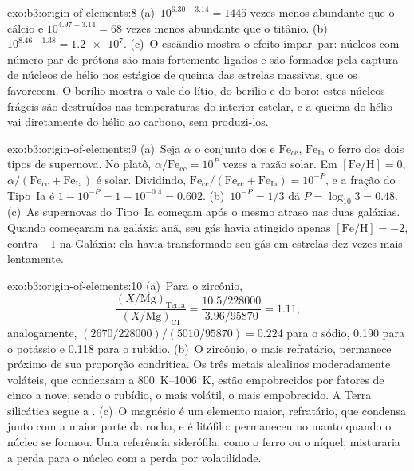 \begin{solution}{exo:b3:origin-of-elements:8}
(a)~$10^{6.30 - 3.14} = 1445$ vezes menos abundante que o cálcio e
$10^{4.97 - 3.14} = 68$ vezes menos abundante que o titânio. (b)~$10^{8.46 - 1.38}
= \num{1.2e7}$. (c)~O escândio mostra o efeito ímpar--par: núcleos com
número par de prótons são mais fortemente ligados e são formados pela
captura de núcleos de hélio nos estágios de queima das estrelas massivas, que os
favorecem. O berílio mostra o vale do lítio, do berílio e do boro:
estes núcleos frágeis são destruídos nas temperaturas do interior estelar,
e a queima do hélio vai diretamente do hélio ao carbono,
sem produzi-los.
\end{solution}

\begin{solution}{exo:b3:origin-of-elements:9}
(a)~Seja $\alpha$ o conjunto dos  e $\mathrm{Fe}_\mathrm{cc}$,
$\mathrm{Fe}_\mathrm{Ia}$ o ferro dos dois tipos de supernova. No
platô, $\alpha/\mathrm{Fe}_\mathrm{cc} = 10^{P}$ vezes a
razão solar. Em $[\mathrm{Fe/H}] = 0$, $\alpha/(\mathrm{Fe}_\mathrm{cc} +
\mathrm{Fe}_\mathrm{Ia})$ é solar. Dividindo,
$\mathrm{Fe}_\mathrm{cc}/(\mathrm{Fe}_\mathrm{cc} + \mathrm{Fe}_\mathrm{Ia})
= 10^{-P}$, e a fração do Tipo~Ia é $1 - 10^{-P} = 1 - 10^{-0.4} =
\num{0.602}$. (b)~$10^{-P} = 1/3$ dá $P = \log_{10}3 = 0.48$.
(c)~As supernovas do Tipo~Ia começam após o mesmo atraso nas duas galáxias.
Quando começaram na galáxia anã, seu gás havia atingido apenas
$[\mathrm{Fe/H}] = -2$, contra $-1$ na Galáxia: ela havia transformado
seu gás em estrelas dez vezes mais lentamente.
\end{solution}

\begin{solution}{exo:b3:origin-of-elements:10}
(a)~Para o zircônio,
\[
\frac{(X/\mathrm{Mg})_\mathrm{Terra}}{(X/\mathrm{Mg})_\mathrm{CI}} =
\frac{10.5/228000}{3.96/95870} = 1.11 ;
\]
analogamente, $(2670/228000)/(5010/95870) = 0.224$ para o sódio,
\num{0.190} para o potássio e \num{0.118} para o rubídio. (b)~O zircônio, o mais refratário, permanece
próximo de sua proporção condrítica. Os três metais alcalinos moderadamente voláteis,
que condensam a \qtyrange{800}{1006}{K}, estão empobrecidos por
fatores de cinco a nove, sendo o rubídio, o mais volátil, o mais empobrecido. A
Terra silicática segue a . (c)~O magnésio é um elemento maior,
refratário, que condensa junto com a maior parte da rocha, e é
litófilo: permaneceu no manto quando o núcleo se formou. Uma referência siderófila,
como o ferro ou o níquel, misturaria a perda para o núcleo com a
perda por volatilidade.
\end{solution}

